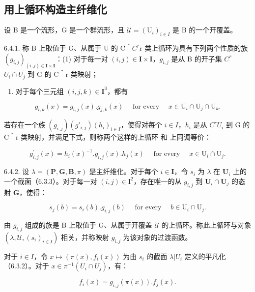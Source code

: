 \subsection{用上循环构造主纤维化}

设 B 是一个流形，G 是一个群流形，且 \(\mathcal{U} = (\mathrm{U}_{i})_{i\in I}\) 是 B 的一个开覆盖。

6.4.1. 称 B 上取值于 G、从属于 U 的 C＾\(C^{r}\)r 类上循环为具有下列两个性质的族 \((g_{i,j})_{(i,j)\in\mathbf{I}\times\mathbf{I}}\)：(1) 对于每一对 \((i,j)\in\mathbf{I}\times\mathbf{I}\)，\(g_{i,j}\) 是从 B 的开子集 \(C^{r}\)\(U_{i}\cap U_{j}\) 到 G 的 C＾r 类映射；

\begin{enumerate}
\def\labelenumi{(\arabic{enumi})}
\setcounter{enumi}{1}
\tightlist
\item
  对于每个三元组 \((i,j,k)\in \mathbf{I}^3\)，都有
\end{enumerate}

\[
g _ {i, k} (x) = g _ {i, j} (x). g _ {j, k} (x) \quad \text { for   every } \quad x \in \mathrm{U} _ {i} \cap \mathrm{U} _ {j} \cap \mathrm{U} _ {k}.
\]

若存在一个族 \((g_{i,j})\)\((g'_{i,j})\)\((h_{i})_{i\in I}\)，使得对每个 \(i\in I\)，\(h_{i}\) 是从 \(C^{r}\)\(U_{i}\) 到 G 的 C＾r 类映射，并满足下式，则称两个这样的上循环  和  上同调等价：

\[
g _ {i, j} ^ {\prime} (x) = h _ {i} (x) ^ {- 1}. g _ {i, j} (x). h _ {j} (x) \quad \text { for   every } \quad x \in \mathrm{U} _ {i} \cap \mathrm{U} _ {j}.\tag{3}
\]

6.4.2. 设 \(\lambda = (\mathbf{P},\mathbf{G},\mathbf{B},\pi)\) 是主纤维化。对于每个 \(i\in \mathbf{I}\)，令 \(s_i\) 为 \(\lambda\) 在 \(\mathbf{U}_i\) 上的一个截面（6.3.3）。对于每一对 \((i,j)\in \mathrm{I}^2\)，存在唯一的从 \(g_{i,j}\) 到 \(\mathbf{U}_i\cap \mathbf{U}_j\) 的态射 \(\mathbf{G}\)，使得：

\[
s _ {j} (b) = s _ {i} (b). g _ {i, j} (b) \quad \text { for   every } \quad b \in \mathrm{U} _ {i} \cap \mathrm{U} _ {j}.\tag{4}
\]

由 \(g_{i,j}\) 组成的族是 B 上取值于 G、从属于开覆盖 \(\mathcal{U}\) 的上循环。称此上循环与对象 \((\lambda, \mathcal{U}, (s_i)_{i \in I})\) 相关，并称映射 \(g_{i,j}\) 为该对象的过渡函数。

对于 \(i \in I\)，令 \(x \mapsto (\pi(x), f_i(x))\) 为由 \(s_i\) 的截面 \(\lambda |U_i\) 定义的平凡化（6.3.2）。对于 \(x \in \pi^{-1}(U_i \cap U_j)\)，有：

\[
f _ {i} (x) = g _ {i, j} (\pi (x)). f _ {j} (x).\tag{5}
\]

